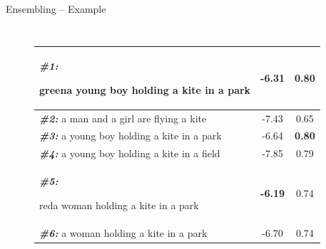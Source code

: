 \documentclass{beamer}
\newcommand{\red}[1]{\protect\begin{color}{red}#1\protect\end{color}}
\newcommand{\green}[1]{\protect\begin{color}{green}#1\protect\end{color}}
\begin{document}
\begin{frame}{Ensembling -- Example}
\begin{columns}
\begin{figure}[thp]
\begin{center}
{\begin{tabular}{|l|c|c|}
        \textbf{\scriptsize\em \#1:} \scriptsize \green{a young boy holding a kite in a park} & -6.31 &\bf 0.80 \\\hline
        \textbf{\scriptsize\em \#2:} \scriptsize a man and a girl are flying a kite    & -7.43 & 0.65 \\\hline
        \textbf{\scriptsize\em \#3:} \scriptsize a young boy holding a kite in a park  & -6.64 &\bf 0.80 \\\hline
        \textbf{\scriptsize\em \#4:} \scriptsize a young boy holding a kite in a field & -7.85 & 0.79 \\\hline
        \textbf{\scriptsize\em \#5:} \scriptsize \red{a woman holding a kite in a park}&\bf-6.19 & 0.74 \\\hline
        \textbf{\scriptsize\em \#6:} \scriptsize a woman holding a kite in a park      & -6.70 & 0.74 \\\hline
      \end{tabular}
      }
        \vfill
      \end{center}
    \end{figure}
\end{columns}
\end{frame}
\end{document}
